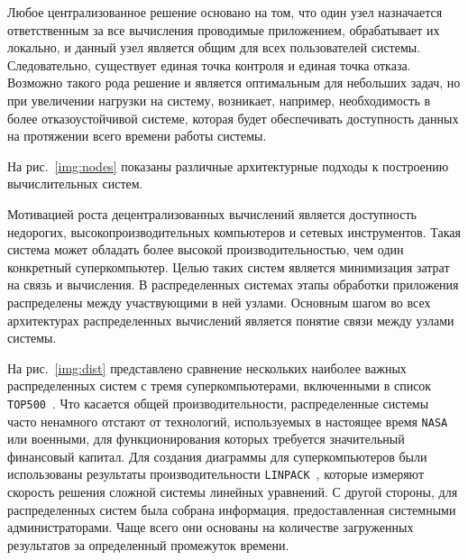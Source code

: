 Любое централизованное решение основано на том, что один узел назначается ответственным за все вычисления проводимые приложением, обрабатывает их локально, и данный узел является общим для всех пользователей системы.
Следовательно, существует единая точка контроля и единая точка отказа. 
Возможно такого рода решение и является оптимальным для небольших задач, но при увеличении нагрузки на систему, возникает, например, необходимость в более отказоустойчивой системе, которая будет обеспечивать доступность данных на протяжении всего времени работы системы.

На рис.~\ref{img:nodes} показаны различные архитектурные подходы к построению вычислительных систем.


Мотивацией роста децентрализованных вычислений является доступность недорогих, высокопроизводительных компьютеров и сетевых инструментов. 
Такая система может обладать более высокой производительностью, чем один конкретный суперкомпьютер. 
Целью таких систем является минимизация затрат на связь и вычисления. 
В распределенных системах этапы обработки приложения распределены между участвующими в ней узлами. 
Основным шагом во всех архитектурах распределенных вычислений является понятие связи между узлами системы.

На рис.~\ref{img:dist} представлено сравнение нескольких наиболее важных распределенных систем с тремя суперкомпьютерами, включенными в список \texttt{TOP500}~\cite{top500}. 
Что касается общей производительности, распределенные системы часто ненамного отстают от технологий, используемых в настоящее время \texttt{NASA} или военными, для функционирования которых требуется значительный финансовый капитал. 
Для создания диаграммы для суперкомпьютеров были использованы результаты производительности \texttt{LINPACK}~\cite{linpack}, которые измеряют скорость решения сложной системы линейных уравнений. 
С другой стороны, для распределенных систем была собрана информация, предоставленная системными администраторами.
Чаще всего они основаны на количестве загруженных результатов за определенный промежуток времени.


% 

